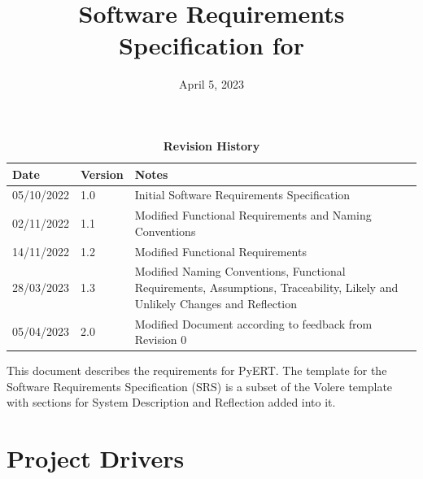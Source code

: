 \documentclass[12pt, titlepage]{article}
\begin{document}
\title{Software Requirements Specification for \progname} 
\author{\authname}
\date{April 5, 2023}
	
\maketitle

\tableofcontents
\listoftables
\listoffigures

\begin{table}[H]
\caption{\bf Revision History}
\begin{tabularx}{\textwidth}{p{3cm}p{2cm}X}
\toprule {\bf Date} & {\bf Version} & {\bf Notes}\\
\midrule
05/10/2022 & 1.0 & Initial Software Requirements Specification\\
02/11/2022 & 1.1 & Modified Functional Requirements and Naming Conventions\\
14/11/2022 & 1.2 & Modified Functional Requirements\\
28/03/2023 & 1.3 & Modified Naming Conventions, Functional Requirements, Assumptions, Traceability, Likely and Unlikely Changes and Reflection\\
05/04/2023 & 2.0 & Modified Document according to feedback from Revision 0\\
\bottomrule
\end{tabularx}
\end{table}

\newpage


This document describes the requirements for PyERT. The template for the Software Requirements Specification (SRS) is a subset of the Volere template~\citep{RobertsonAndRobertson2012} with sections for System Description and Reflection added into it.

\section{Project Drivers}
\end{document}
